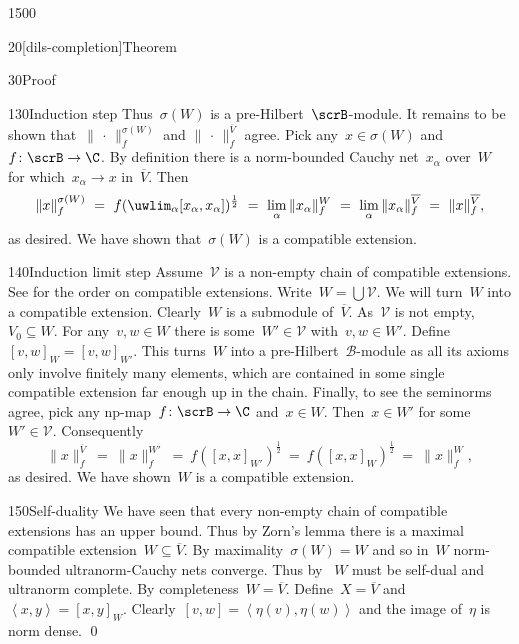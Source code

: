 \begin{parsec}{1500}
\begin{point}{20}[dils-completion]{Theorem}
\begin{point}{30}{Proof}
\begin{point}{130}{Induction step}
Thus~$\sigma(W)$ is a pre-Hilbert~$\scrB$-module.
It remains to be shown that~$\|\,\cdot\,\|_f^{\sigma(W)}$
    and $\|\,\cdot\,\|_f^{\overline{V}}$
    agree.
Pick any~$x \in \sigma(W)$ and~$f\colon \scrB \to \C$.
By definition there is a norm-bounded Cauchy net~$x_\alpha$ over~$W$
    for which~$x_\alpha \to x$ in~$\overline{V}$.
Then
\begin{equation*}
    \|x\|^{\sigma(W)}_f
       \ =\ f(\uwlim_\alpha [x_\alpha,x_\alpha])^{\frac{1}{2}}
       \ =\ \lim_\alpha \|x_\alpha\|_f^W
       \ =\ \lim_\alpha \|x_\alpha\|_f^{\overline{V}}
       \ =\ \|x\|_f^{\overline{V}},
\end{equation*}
as desired.
We have shown that~$\sigma(W)$ is a compatible extension.
\end{point}
\begin{point}{140}{Induction limit step}%
    Assume~$\mathscr{V}$
        is a non-empty chain of compatible extensions.
        See  for the order on compatible extensions.
    Write~$W = \bigcup \mathscr{V}$.
    We will turn~$W$ into a compatible extension.
    Clearly~$W$ is a submodule of~$\overline{V}$.
    As~$\mathscr{V}$ is not empty, $V_0 \subseteq W$.
    For any~$v,w \in W$
    there is some~$W' \in \mathscr{V}$ with~$v,w \in W'$.
    Define~$[v,w]_W = [v,w]_{W'}$.
    This turns~$W$ into a pre-Hilbert~$\mathscr{B}$-module
        as all its axioms only involve finitely many elements,
        which are contained in some single compatible extension far enough up
        in the chain.
    Finally, to see the seminorms agree,
        pick any np-map~$f\colon \scrB \to \C$
        and~$x \in W$.
    Then~$x \in W'$ for some~$W' \in \mathscr{V}$.
    Consequently
    \begin{equation*}
        \|x\|^{\overline{V}}_f
        \ =\ \|x\|^{W'}_f
        \ =\ f([x,x]_{W'})^{\frac{1}{2}}
        \ =\ f([x,x]_{W})^{\frac{1}{2}}
        \ =\  \|x\|^{W}_f,
    \end{equation*}
    as desired.  We have shown~$W$ is a compatible extension.
\end{point}
\begin{point}{150}{Self-duality}
    We have seen
    that every non-empty chain of compatible extensions
        has an upper bound.
    Thus by Zorn's lemma there is a maximal compatible
        extension~$W\subseteq \overline{V}$.
    By maximality~$\sigma(W) = W$
        and so in~$W$ norm-bounded ultranorm-Cauchy nets converge.
    Thus by~
        $W$ must be self-dual and ultranorm complete.
    By completeness~$W = \overline{V}$.
    Define~$X = \overline{V}$
        and~$\left<x,y\right> = [x,y]_{W}$.
    Clearly~$[v,w] = \left<\eta(v),\eta(w)\right>$
        and the image of~$\eta$ is norm dense. \qed
\end{point}
\end{point}
\end{point}
\end{parsec}
